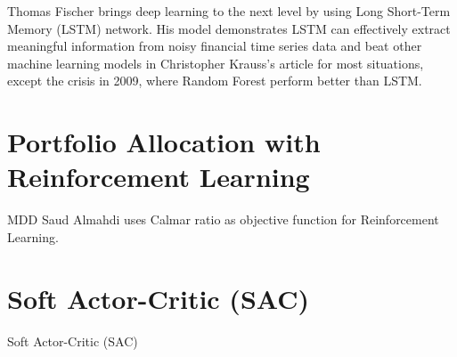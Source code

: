 Thomas Fischer brings deep learning to the next level by using Long Short-Term Memory (LSTM) network.\cite{FISCHER2018654} His model demonstrates LSTM can effectively extract meaningful information from noisy financial time series data and beat other machine learning models in  Christopher Krauss's article  \cite{KRAUSS2017689} for most situations, except the crisis in 2009, where Random Forest perform better than LSTM.

\section{Portfolio Allocation with Reinforcement Learning}
MDD\cite{magdon2004maximum}
Saud Almahdi uses Calmar ratio as objective function for Reinforcement Learning.
\cite{AdaptivePortfolioTradingSystem}
\section{Soft Actor-Critic (SAC)}
Soft Actor-Critic (SAC)\cite{haarnoja2018soft}


